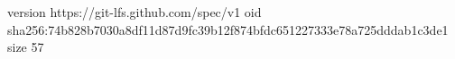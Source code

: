 version https://git-lfs.github.com/spec/v1
oid sha256:74b828b7030a8df11d87d9fc39b12f874bfdc651227333e78a725dddab1c3de1
size 57
